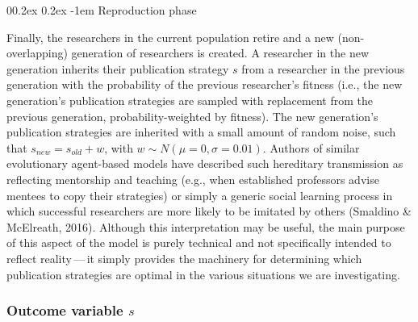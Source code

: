 \documentclass[
  ,man,mask,floatsintext]{apa6}
\makeatletter
\let\oldparagraph\paragraph
\renewcommand{\paragraph}[1]{\oldparagraph{#1}\mbox{}}
\renewcommand{\paragraph}{\@startsection{paragraph}{4}{\parindent}%
  {0\baselineskip \@plus 0.2ex \@minus 0.2ex}%
  {-1em}%
  {\normalfont\normalsize\bfseries\itshape\typesectitle}}
\makeatother
\begin{document}
\hypertarget{reproduction-phase}{%
\paragraph{Reproduction phase}\label{reproduction-phase}}

Finally, the researchers in the current population retire and a new (non-overlapping) generation of researchers is created.
A researcher in the new generation inherits their publication strategy \(s\) from a researcher in the previous generation with the probability of the previous researcher's fitness (i.e., the new generation's publication strategies are sampled with replacement from the previous generation, probability-weighted by fitness).
The new generation's publication strategies are inherited with a small amount of random noise, such that \(s_{new} = s_{old} + w\), with \(w \sim N(\mu = 0, \sigma = 0.01)\).
Authors of similar evolutionary agent-based models have described such hereditary transmission as reflecting mentorship and teaching (e.g., when established professors advise mentees to copy their strategies) or simply a generic social learning process in which successful researchers are more likely to be imitated by others (Smaldino \& McElreath, 2016).
Although this interpretation may be useful, the main purpose of this aspect of the model is purely technical and not specifically intended to reflect reality\(\,\)---\(\,\)it simply provides the machinery for determining which publication strategies are optimal in the various situations we are investigating.

\hypertarget{outcome-variable-s}{%
\subsubsection{\texorpdfstring{Outcome variable \(s\)}{Outcome variable s}}\label{outcome-variable-s}}
\end{document}
